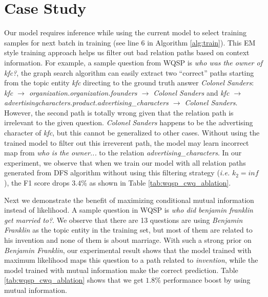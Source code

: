 \section{Case Study}\label{sec:case}


Our model requires inference while using the current model to select training samples for next batch in training (see line 6 in Algorithm \ref{alg:train}). This EM style training approach helps us filter out bad relation paths based on context information. For example, a sample question from WQSP is \textit{who was the owner of kfc?}, the graph search algorithm can easily extract two ``correct'' paths starting from the topic entity \textit{kfc} directing to the ground truth answer \textit{Colonel Sanders}: \textit{kfc $\rightarrow$ organization.organization.founders $\rightarrow$ Colonel Sanders} and \textit{kfc $\rightarrow$ advertisingcharacters.product.advertising\_characters $\rightarrow$ Colonel Sanders}. However, the second path is totally wrong given that the relation path is irrelevant to the given question. \textit{Colonel Sanders} happens to be the advertising character of \textit{kfc}, but this cannot be generalized to other cases. Without using the trained model to filter out this irreverent path, the model may learn incorrect map from \textit{who is the owner...} to the relation \textit{advertising\_characters}. In our experiment, we observe that when we train our model with all relation paths generated from DFS algorithm without using this filtering strategy (\emph{i.e.} $k_2=inf$), the F1 score drops $3.4\%$ as shown in Table \ref{tab:wqsp_cwq_ablation}.

Next we demonstrate the benefit of maximizing conditional mutual information instead of likelihood. A sample question in WQSP is \textit{who did benjamin franklin get married to?}. We observe that there are 13 questions are using \textit{Benjamin Franklin} as the topic entity in the training set, but most of them are related to his invention and none of them is about marriage. With such a strong prior on \textit{Benjamin Franklin}, our experimental result shows that the model trained with maximum likelihood maps this question to a path related to \textit{invention}, while the model trained with mutual information make the correct prediction. Table \ref{tab:wqsp_cwq_ablation} shows that we get $1.8\%$ performance boost by using mutual information.




